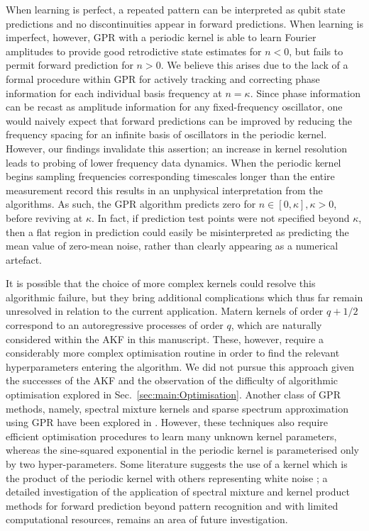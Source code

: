 {When learning is perfect, a repeated pattern can be interpreted as qubit state predictions and no discontinuities appear in forward predictions. When learning is imperfect, however, GPR with a periodic kernel is able to learn Fourier amplitudes to provide good retrodictive state estimates for $n<0$, but fails to permit forward prediction for $n>0$.  We believe this arises due to the lack of a formal procedure within GPR for actively  tracking and correcting phase information for each individual basis frequency at $n= \kappa$.  Since phase information can be recast as amplitude information for any fixed-frequency oscillator, one would naively expect that forward predictions can be improved by reducing the frequency spacing for an infinite basis of oscillators in the periodic kernel.  However, our findings invalidate this assertion; an increase in kernel resolution leads to probing of lower frequency data dynamics.  When the periodic kernel begins sampling frequencies corresponding timescales longer than the entire measurement record this results in an unphysical interpretation from the algorithms.  As such, the GPR algorithm predicts zero for $n \in [0, \kappa], \kappa > 0$, before reviving at $\kappa$.  In fact, if prediction test points were not specified beyond $\kappa$, then a flat region in prediction could easily be misinterpreted as predicting the mean value of zero-mean noise, rather than clearly appearing as a numerical artefact. 

It is possible that the choice of more complex kernels could resolve this algorithmic failure, but they bring additional complications which thus far remain unresolved in relation to the current application.  Matern kernels of order $q + 1/2$ correspond to an autoregressive processes of order $q$, which are naturally considered within the AKF in this manuscript. These, however, require a considerably more complex optimisation routine in order to find the relevant hyperparameters entering the algorithm.  We did not pursue this approach given the successes of the AKF and the observation of the difficulty of algorithmic optimisation explored in Sec.~\ref{sec:main:Optimisation}.  Another class of GPR methods, namely, spectral mixture kernels and sparse spectrum approximation using GPR have been explored in \cite{wilson2013, quia2010}. However, these techniques also require efficient optimisation procedures to learn many unknown kernel parameters, whereas the sine-squared exponential in the periodic kernel is parameterised only by two hyper-parameters.  Some literature suggests the use of a kernel which is the product of the periodic kernel with others representing white noise \cite{klenske2016gaussian}; a detailed investigation of the application of spectral mixture and kernel product methods for forward prediction beyond pattern recognition and with limited computational resources, remains an area of future investigation.



}
